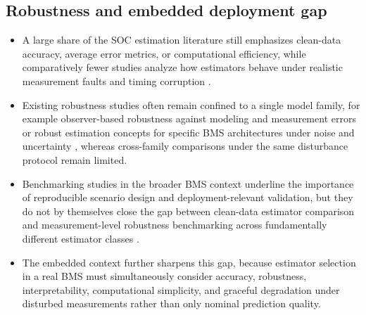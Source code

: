\documentclass[review]{elsarticle}
\begin{document}
\subsection{Robustness and embedded deployment gap}
\begin{itemize}[leftmargin=*]
    \item A large share of the SOC estimation literature still emphasizes clean-data accuracy, average error metrics, or computational efficiency, while comparatively fewer studies analyze how estimators behave under realistic measurement faults and timing corruption \cite{shrivastavaReviewTechnologicalAdvancement2023,Embedded_AI_only_SOC_mobile,giazitzisCaseStudyTiny2024,mazziStateChargeEstimation2022}.
    \item Existing robustness studies often remain confined to a single model family, for example observer-based robustness against modeling and measurement errors \cite{liRobustnessSOCEstimation2015} or robust estimation concepts for specific BMS architectures under noise and uncertainty \cite{naseriReliableWirelessBMS2025}, whereas cross-family comparisons under the same disturbance protocol remain limited.
    \item Benchmarking studies in the broader BMS context underline the importance of reproducible scenario design and deployment-relevant validation, but they do not by themselves close the gap between clean-data estimator comparison and measurement-level robustness benchmarking across fundamentally different estimator classes \cite{bergerBenchmarkingBatteryManagement2024}.
    \item The embedded context further sharpens this gap, because estimator selection in a real BMS must simultaneously consider accuracy, robustness, interpretability, computational simplicity, and graceful degradation under disturbed measurements rather than only nominal prediction quality.
\end{itemize}
\end{document}
